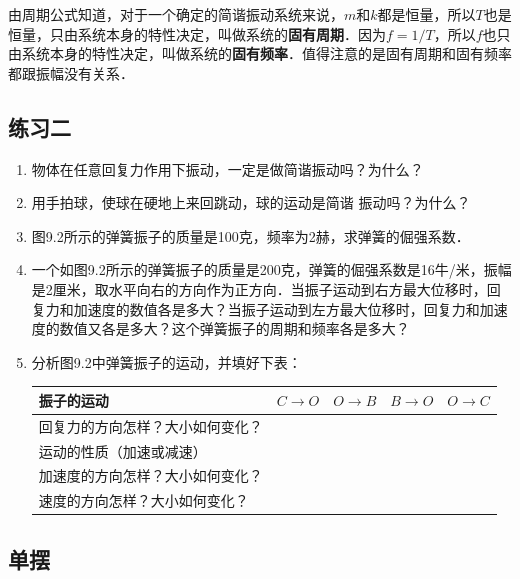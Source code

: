 由周期公式知道，对于一个确定的简谐振动系统来说，$m$和$k$都是恒量，所以$T$也是恒量，只由系统本身的特性决定，叫做系统的\textbf{固有周期}．因为$f=1/T$，所以$f$也只由系统本身的特性决定，叫做系统的\textbf{固有频率}．值得注意的是固有周期和固有频率都跟振幅没有关系．

\subsection*{练习二}

\begin{enumerate}
    \item 物体在任意回复力作用下振动，一定是做简谐振动吗？为什么？
    \item 用手拍球，使球在硬地上来回跳动，球的运动是简谐
          振动吗？为什么？
    \item 图9.2所示的弹簧振子的质量是100克，频率为2赫，求弹簧的倔强系数．
    \item 一个如图9.2所示的弹簧振子的质量是200克，弹簧的倔强系数是16牛/米，振幅是2厘米，取水平向右的方向作为正方向．当振子运动到右方最大位移时，回复力和加速度的数值各是多大？当振子运动到左方最大位移时，回复力和加速度的数值又各是多大？这个弹簧振子的周期和频率各是多大？
    \item 分析图9.2中弹簧振子的运动，并填好下表：
          \begin{table}[H]
              \centering
              \begin{tabularx}{0.95\textwidth}{p{6cm}|M|M|M|M}
                  \hline
                  振子的运动            & $C\to O$ & $O\to B$ & $B\to O$ & $O\to C$ \\
                  \hline
                  回复力的方向怎样？大小如何变化？ &          &          &          &          \\
                  运动的性质（加速或减速）     &          &          &          &          \\
                  加速度的方向怎样？大小如何变化？ &          &          &          &          \\
                  速度的方向怎样？大小如何变化？  &          &          &          &          \\
                  \hline
              \end{tabularx}
          \end{table}
\end{enumerate}
\subsection{单摆}
